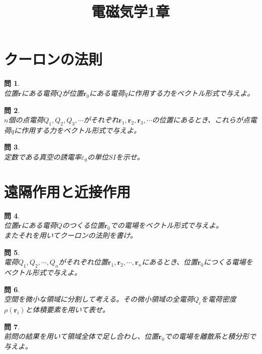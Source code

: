 \documentclass{jsarticle}
\title{電磁気学1章}
\author{}
\date{}
\newtheorem{pro}{問}[section]
\begin{document}
\maketitle
\noindent
\section{クーロンの法則}
\noindent
\begin{pro}~\\
位置\(\bm{r}\)にある電荷\(Q\)が位置\(\bm{r}_{0}\)にある電荷\(q\)に作用する力をベクトル形式で与えよ。
\end{pro}

\begin{pro}~\\
\(n\)個の点電荷\(Q_{1},Q_{2},Q_{3},\cdots\)がそれぞれ\(\bm{r}_{1},\bm{r}_{2},\bm{r}_{3},\cdots\)の位置にあるとき、これらが点電荷\(q\)に作用する力をベクトル形式で与えよ。
\end{pro}

\begin{pro}~\\
定数である真空の誘電率\(\varepsilon_{0}\)の単位\(SI\)を示せ。
\end{pro}

\section{遠隔作用と近接作用}
\noindent
\begin{pro}~\\
位置\(\bm{r}\)にある電荷\(Q\)のつくる位置\(\bm{r}_{0}\)での電場をベクトル形式で与えよ。\\
またそれを用いてクーロンの法則を書け。
\end{pro}

\begin{pro}~\\
電荷\(Q_{1},Q_{2},\cdots,Q_{n}\)がそれぞれ位置\(\bm{r}_{1},\bm{r}_{2},\cdots,\bm{r}_{n}\)にあるとき、位置\(\bm{r}_{0}\)につくる電場をベクトル形式で与えよ。
\end{pro}

\begin{pro}~\\
空間を微小な領域に分割して考える。その微小領域の全電荷\(Q_{i}\)を電荷密度\(\rho(\bm{r}_{i})\)と体積要素を用いて表せ。
\end{pro}

\begin{pro}~\\
前問の結果を用いて領域全体で足し合わし、位置\(\bm{r}_{0}\)での電場を離散系と積分形で与えよ。
\end{pro}
\end{document}
